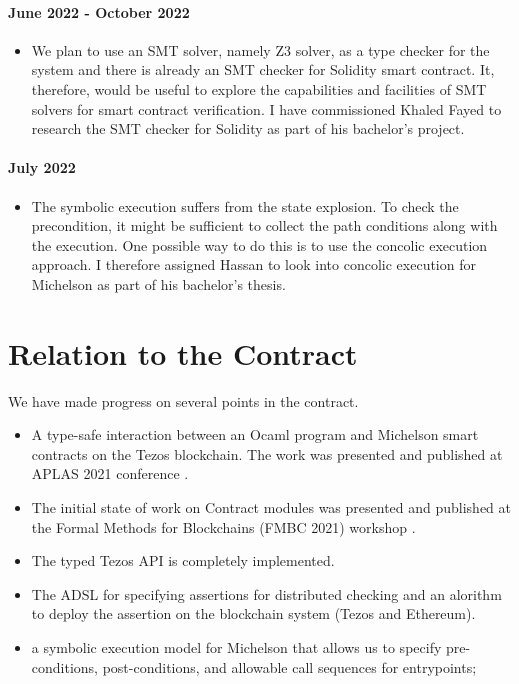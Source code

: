 \documentclass[a4paper,11pt]{article}
\begin{document}
\paragraph{June 2022 - October 2022} 
\begin{itemize}
\item We plan to use an SMT solver, namely Z3  solver, as a type checker for the system and there is already an SMT checker for Solidity smart contract. It, therefore, would be useful to explore the capabilities and facilities of SMT solvers for smart contract verification. I have commissioned Khaled Fayed to research the SMT checker for Solidity as part of his bachelor's project.
\end{itemize}

\paragraph{July 2022}
\begin{itemize}
\item The symbolic execution suffers from the state explosion. To check the precondition, it might be sufficient to collect the path conditions along with the execution. One possible way to do this is to use the concolic execution approach. I therefore assigned Hassan to look into concolic execution for Michelson as part of his bachelor's thesis.
\end{itemize}

\section{Relation to the Contract}
\label{sec:relation-contract}

We have made progress on several points in the contract.
\begin{itemize}
\item A type-safe interaction between an Ocaml program and Michelson smart contracts on the Tezos blockchain. The work was presented and published at APLAS 2021 conference \cite{DBLP:conf/fc/ThiemannAplas21}. 
\item The initial state of work on Contract modules was presented and published at the Formal Methods for Blockchains (FMBC 2021) workshop \cite{DBLP:conf/fc/ThiemannFmbc21}.

\item The typed Tezos API is completely implemented.
\item The ADSL for specifying assertions for distributed checking and an alorithm to deploy the assertion on the blockchain system (Tezos and Ethereum).
\item a symbolic execution model for Michelson that allows us to specify pre-conditions, post-conditions, and allowable call sequences for entrypoints; 
\end{itemize}
\end{document}

